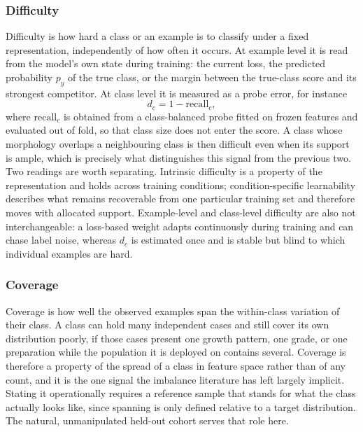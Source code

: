 \documentclass[11pt]{article}
\begin{document}
\subsubsection{Difficulty}
Difficulty is how hard a class or an example is to classify under a fixed representation, independently of how often it occurs. At example level it is read from the model's own state during training: the current loss, the predicted probability $p_y$ of the true class, or the margin between the true-class score and its strongest competitor. At class level it is measured as a probe error, for instance
\begin{equation}
  d_c = 1-\mathrm{recall}_c,
  \label{eq:difficulty}
\end{equation}
\noindent where $\mathrm{recall}_c$ is obtained from a class-balanced probe fitted on frozen features and evaluated out of fold, so that class size does not enter the score. A class whose morphology overlaps a neighbouring class is then difficult even when its support is ample, which is precisely what distinguishes this signal from the previous two. Two readings are worth separating. Intrinsic difficulty is a property of the representation and holds across training conditions; condition-specific learnability describes what remains recoverable from one particular training set and therefore moves with allocated support. Example-level and class-level difficulty are also not interchangeable: a loss-based weight adapts continuously during training and can chase label noise, whereas $d_c$ is estimated once and is stable but blind to which individual examples are hard.

\subsubsection{Coverage}
Coverage is how well the observed examples span the within-class variation of their class. A class can hold many independent cases and still cover its own distribution poorly, if those cases present one growth pattern, one grade, or one preparation while the population it is deployed on contains several. Coverage is therefore a property of the spread of a class in feature space rather than of any count, and it is the one signal the imbalance literature has left largely implicit. Stating it operationally requires a reference sample that stands for what the class actually looks like, since spanning is only defined relative to a target distribution. The natural, unmanipulated held-out cohort serves that role here.
\end{document}
